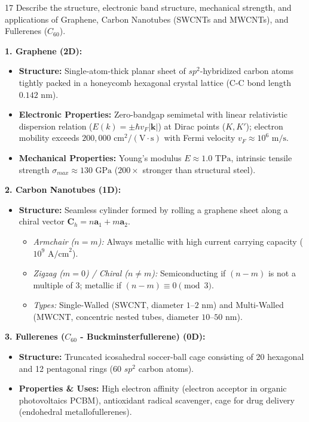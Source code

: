 \begin{theoryq}{17}
Describe the structure, electronic band structure, mechanical strength, and applications of Graphene, Carbon Nanotubes (SWCNTs and MWCNTs), and Fullerenes ($C_{60}$).
\end{theoryq}
\begin{theorysol}
\textbf{1. Graphene (2D):}
\begin{itemize}
\item \textbf{Structure:} Single-atom-thick planar sheet of $sp^2$-hybridized carbon atoms tightly packed in a honeycomb hexagonal crystal lattice (C-C bond length $0.142\text{ nm}$).
\item \textbf{Electronic Properties:} Zero-bandgap semimetal with linear relativistic dispersion relation ($E(k) = \pm \hbar v_F |\mathbf{k}|$) at Dirac points ($K, K'$); electron mobility exceeds $200{,}000\text{ cm}^2/(\text{V}\cdot\text{s})$ with Fermi velocity $v_F \approx 10^6\text{ m/s}$.
\item \textbf{Mechanical Properties:} Young's modulus $E \approx 1.0\text{ TPa}$, intrinsic tensile strength $\sigma_{max} \approx 130\text{ GPa}$ ($200\times$ stronger than structural steel).
\end{itemize}

\textbf{2. Carbon Nanotubes (1D):}
\begin{itemize}
\item \textbf{Structure:} Seamless cylinder formed by rolling a graphene sheet along a chiral vector $\mathbf{C}_h = n\mathbf{a}_1 + m\mathbf{a}_2$.
  \begin{itemize}
  \item \textit{Armchair ($n=m$):} Always metallic with high current carrying capacity ($10^9\text{ A/cm}^2$).
  \item \textit{Zigzag ($m=0$) / Chiral ($n \ne m$):} Semiconducting if $(n-m)$ is not a multiple of 3; metallic if $(n-m) \equiv 0 \pmod 3$.
  \item \textit{Types:} Single-Walled (SWCNT, diameter $1\text{--}2\text{ nm}$) and Multi-Walled (MWCNT, concentric nested tubes, diameter $10\text{--}50\text{ nm}$).
  \end{itemize}
\end{itemize}

\textbf{3. Fullerenes ($C_{60}$ - Buckminsterfullerene) (0D):}
\begin{itemize}
\item \textbf{Structure:} Truncated icosahedral soccer-ball cage consisting of 20 hexagonal and 12 pentagonal rings ($60$ $sp^2$ carbon atoms).
\item \textbf{Properties \& Uses:} High electron affinity (electron acceptor in organic photovoltaics PCBM), antioxidant radical scavenger, cage for drug delivery (endohedral metallofullerenes).
\end{itemize}
\end{theorysol}
\vspace{4mm}

